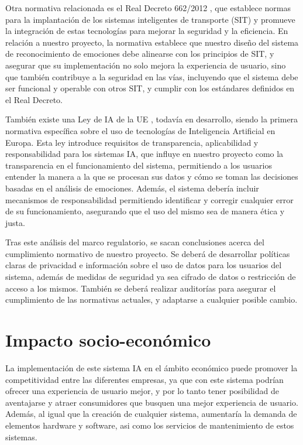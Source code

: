 \documentclass[12pt]{report} %
\begin{document}
Otra normativa relacionada es el Real Decreto 662/2012 \cite{rd-sit}, que establece normas para la implantación de los sistemas inteligentes de transporte (SIT) y promueve la integración de estas tecnologías para mejorar la seguridad y la eficiencia. En relación a nuestro proyecto, la normativa establece que nuestro diseño del sistema de reconocimiento de emociones debe alinearse con los principios de SIT, y asegurar que su implementación no solo mejora la experiencia de usuario, sino que también contribuye a la seguridad en las vías, incluyendo que el sistema debe ser funcional y operable con otros SIT, y cumplir con los estándares definidos en el Real Decreto. 

También existe una Ley de IA de la UE \cite{normativaIA}, todavía en desarrollo, siendo la primera normativa específica sobre el uso de tecnologías de Inteligencia Artificial en Europa. Esta ley introduce requisitos de transparencia, aplicabilidad y responsabilidad para los sistemas IA, que influye en nuestro proyecto como la transparencia en el funcionamiento del sistema, permitiendo a los usuarios entender la manera a la que se procesan sus datos y cómo se toman las decisiones basadas en el análisis de emociones. Además, el sistema debería incluir mecanismos de responsabilidad permitiendo identificar y corregir cualquier error de su funcionamiento, asegurando que el uso del mismo sea de manera ética y justa. 

Tras este análisis del marco regulatorio, se sacan conclusiones acerca del cumplimiento normativo de nuestro proyecto. Se deberá de desarrollar políticas claras de privacidad e información sobre el uso de datos para los usuarios del sistema, además de medidas de seguridad ya sea cifrado de datos o restricción de acceso a los mismos. También se deberá realizar auditorías para asegurar el cumplimiento de las normativas actuales, y adaptarse a cualquier posible cambio.

\section{Impacto socio-económico}

La implementación de este sistema IA en el ámbito económico puede promover la competitividad entre las diferentes empresas, ya que con este sistema podrían ofrecer una experiencia de usuario mejor, y por lo tanto tener posibilidad de aventajarse y atraer consumidores que busquen una mejor experiencia de usuario. Además, al igual que la creación de cualquier sistema, aumentaría la demanda de elementos hardware y software, asi como los servicios de mantenimiento de estos sistemas.
\end{document}
